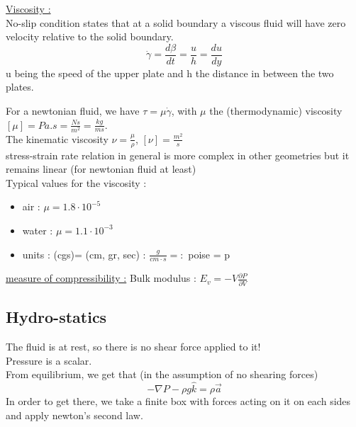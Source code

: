 \documentclass[../main.tex]{subfiles}
\begin{document}
\quad \underline{Viscosity :}\\
No-slip condition states that at a solid boundary a viscous fluid will have zero velocity relative to the solid boundary.\\

\begin{equation}
    \dot{\gamma} = \frac{d\beta}{dt} = \frac{u}{h} = \frac{du}{dy}
\end{equation}
u being the speed of the upper plate and h the distance in between the two plates.

For a newtonian fluid, we have $\tau = \mu \dot{\gamma}$, with $\mu$ the (thermodynamic) viscosity $[\mu] = Pa.s = \frac{Ns}{m^2} = \frac{kg}{ms}$.\\
The kinematic viscosity $\nu = \frac{\mu}{\rho}$, $[\nu] = \frac{m^2}{s}$\\

\color{gray} stress-strain rate relation in general is more complex in other geometries but it remains linear (for newtonian fluid at least)\color{black}\\

Typical values for the viscosity :\\
\begin{itemize}
    \item air : $\mu = 1.8 \cdot 10^{-5}$\\
    \item water : $\mu = 1.1 \cdot 10^{-3}$\\
    \item units : (cgs)= (cm, gr, sec) : $\frac{g}{cm \cdot s} =:$ poise = p\\
\end{itemize}

\underline{measure of compressibility :} Bulk modulus : $E_v = -V \frac{\partial P}{\partial V}$\\

\subsection{Hydro-statics}
The fluid is at rest, so there is no shear force applied to it!\\
Pressure is a scalar.\\

From equilibrium, we get that (in the assumption of no shearing forces)\\
\begin{equation}
    -\nabla P-\rho g \hat{k} = \rho \vec{a}
\end{equation}
In order to get there, we take a finite box with forces acting on it on each sides and apply newton's second law.\\
\end{document}
